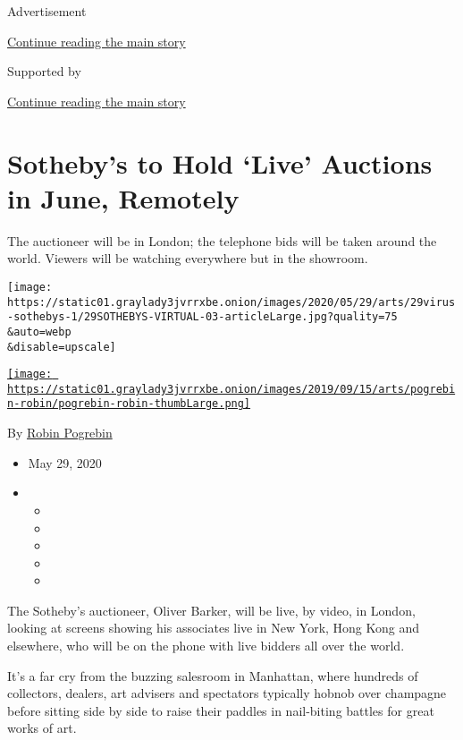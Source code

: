 Advertisement

\protect\hyperlink{after-top}{Continue reading the main story}

Supported by

\protect\hyperlink{after-sponsor}{Continue reading the main story}

\hypertarget{sothebys-to-hold-live-auctions-in-june-remotely}{%
\section{Sotheby's to Hold `Live' Auctions in June,
Remotely}\label{sothebys-to-hold-live-auctions-in-june-remotely}}

The auctioneer will be in London; the telephone bids will be taken
around the world. Viewers will be watching everywhere but in the
showroom.

\texttt{[image: https://static01.graylady3jvrrxbe.onion/images/2020/05/29/arts/29virus-sothebys-1/29SOTHEBYS-VIRTUAL-03-articleLarge.jpg?quality=75\\\&auto=webp\\\&disable=upscale]}

\href{https://www.nytimes3xbfgragh.onion/by/robin-pogrebin}{\texttt{[image: https://static01.graylady3jvrrxbe.onion/images/2019/09/15/arts/pogrebin-robin/pogrebin-robin-thumbLarge.png]}}

By \href{https://www.nytimes3xbfgragh.onion/by/robin-pogrebin}{Robin
Pogrebin}

\begin{itemize}
\item
  May 29, 2020
\item
  \begin{itemize}
  \item
  \item
  \item
  \item
  \item
  \end{itemize}
\end{itemize}

The Sotheby's auctioneer, Oliver Barker, will be live, by video, in
London, looking at screens showing his associates live in New York, Hong
Kong and elsewhere, who will be on the phone with live bidders all over
the world.

It's a far cry from the buzzing salesroom in Manhattan, where hundreds
of collectors, dealers, art advisers and spectators typically hobnob
over champagne before sitting side by side to raise their paddles in
nail-biting battles for great works of art.

